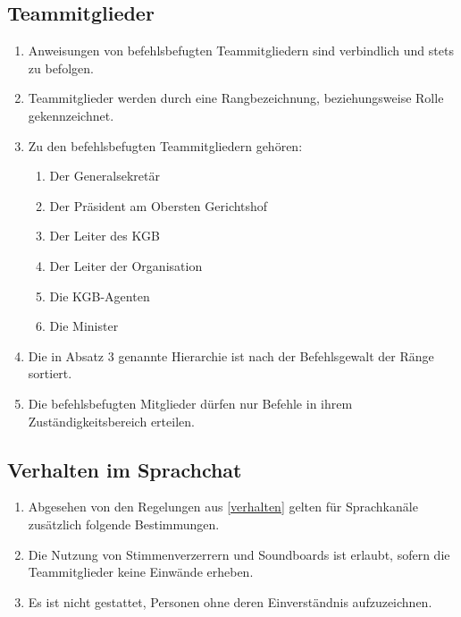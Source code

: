 \documentclass{article}
\begin{document}
\subsection{Teammitglieder}\label{members}
\begin{enumerate}[(1)]
	\item Anweisungen von befehlsbefugten Teammitgliedern sind verbindlich und stets zu befolgen.
	\item Teammitglieder werden durch eine Rangbezeichnung, beziehungsweise Rolle gekennzeichnet.
	\item Zu den befehlsbefugten Teammitgliedern gehören:
	\begin{enumerate}
		\item Der Generalsekretär
		\item Der Präsident am Obersten Gerichtshof
		\item Der Leiter des KGB
		\item Der Leiter der Organisation
		\item Die KGB-Agenten
		\item Die Minister
	\end{enumerate}
    \item Die in Absatz 3 genannte Hierarchie ist nach der Befehlsgewalt der Ränge sortiert.
	\item Die befehlsbefugten Mitglieder dürfen nur Befehle in ihrem Zuständigkeitsbereich erteilen.
\end{enumerate}

\subsection{Verhalten im Sprachchat}
\begin{enumerate}[(1)]
	\item Abgesehen von den Regelungen aus \ref{verhalten} gelten für Sprachkanäle zusätzlich folgende Bestimmungen.
	\item Die Nutzung von Stimmenverzerrern und Soundboards ist erlaubt, sofern die Teammitglieder keine Einwände erheben.
	\item Es ist nicht gestattet, Personen ohne deren Einverständnis aufzuzeichnen.
\end{enumerate}
\end{document}
